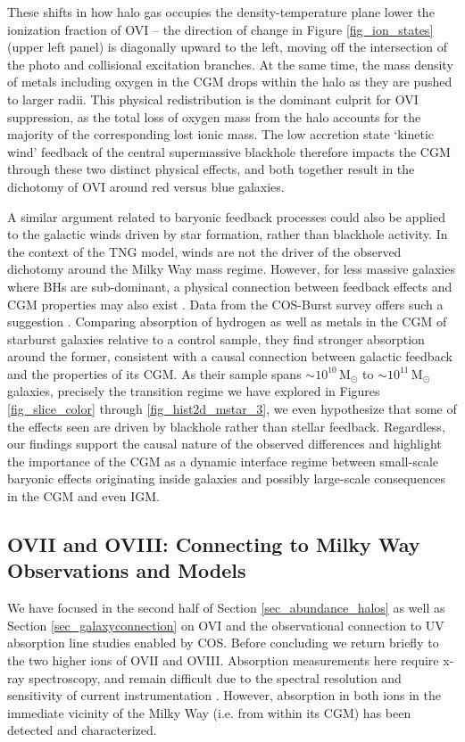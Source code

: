 \documentclass[useAMS,usenatbib]{mnras}
\newcommand{\msun}{\,M$_{\odot}$\xspace}
\newcommand{\ovi}{OVI\xspace}
\newcommand{\ovii}{OVII\xspace}
\newcommand{\oviii}{OVIII\xspace}
\begin{document}
These shifts in how halo gas occupies the density-temperature plane lower the ionization fraction of OVI -- the direction of change in Figure \ref{fig_ion_states} (upper left panel) is diagonally upward to the left, moving off the intersection of the photo and collisional excitation branches. At the same time, the mass density of metals including oxygen in the CGM drops within the halo as they are pushed to larger radii. This physical redistribution is the dominant culprit for \ovi suppression, as the total loss of oxygen mass from the halo accounts for the majority of the corresponding lost ionic mass. The low accretion state `kinetic wind' feedback of the central supermassive blackhole therefore impacts the CGM through these two distinct physical effects, and both together result in the dichotomy of \ovi around red versus blue galaxies.

A similar argument related to baryonic feedback processes could also be applied to the galactic winds driven by star formation, rather than blackhole activity. In the context of the TNG model, winds are not the driver of the observed dichotomy around the Milky Way mass regime. However, for less massive galaxies where BHs are sub-dominant, a physical connection between feedback effects and CGM properties may also exist \citep{nelson15a}. Data from the COS-Burst survey offers such a suggestion \citep{heckman17}. Comparing absorption of hydrogen as well as metals in the CGM of starburst galaxies relative to a control sample, they find stronger absorption around the former, consistent with a causal connection between galactic feedback and the properties of its CGM. As their sample spans $\sim 10^{10}$\msun to $\sim 10^{11}$\msun galaxies, precisely the transition regime we have explored in Figures \ref{fig_slice_color} through \ref{fig_hist2d_mstar_3}, we even hypothesize that some of the effects seen are driven by blackhole rather than stellar feedback. Regardless, our findings support the causal nature of the observed differences and highlight the importance of the CGM as a dynamic interface regime between small-scale baryonic effects originating inside galaxies and possibly large-scale consequences in the CGM and even IGM.

\subsection{\ovii and \oviii: Connecting to Milky Way Observations and Models}

We have focused in the second half of Section \ref{sec_abundance_halos} as well as Section \ref{sec_galaxyconnection} on \ovi and the observational connection to UV absorption line studies enabled by COS. Before concluding we return briefly to the two higher ions of \ovii and \oviii. Absorption measurements here require x-ray spectroscopy, and remain difficult due to the spectral resolution and sensitivity of current instrumentation \citep[e.g.][]{buote09,williams13}. However, absorption in both ions in the immediate vicinity of the Milky Way (i.e. from within its CGM) has been detected and characterized.
\end{document}
